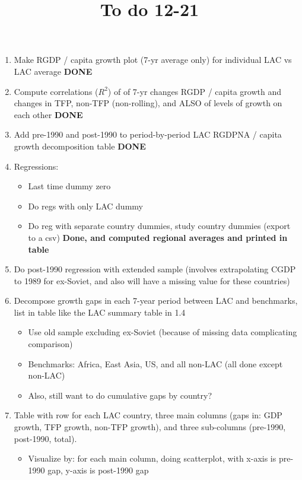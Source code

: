 \documentclass[12pt,english]{article}
\theoremstyle{remark}
\begin{document}
	
\title{To do 12-21}
\maketitle

\begin{enumerate}
	\item Make RGDP / capita growth plot (7-yr average only) for individual LAC vs LAC average \textbf{DONE}
	\item Compute correlations ($R^2$) of of 7-yr changes RGDP / capita growth and changes in TFP, non-TFP (non-rolling), and ALSO of levels of growth on each other \textbf{DONE}
	\item Add pre-1990 and post-1990 to period-by-period LAC RGDPNA / capita growth decomposition table  \textbf{DONE}
	\item Regressions:
	\begin{itemize}
		\item Last time dummy zero 
		\item Do regs with only LAC dummy 
		\item Do reg with separate country dummies, study country dummies (export to a csv) \textbf{Done, and computed regional averages and printed in table}
	\end{itemize}
	\item Do post-1990 regression with extended sample (involves extrapolating CGDP to 1989 for ex-Soviet, and also will have a missing value for these countries)
	\item Decompose growth gaps in each 7-year period between LAC and benchmarks, list in table like the LAC summary table in 1.4
	\begin{itemize}
		\item Use old sample excluding ex-Soviet (because of missing data complicating comparison)
		\item Benchmarks: Africa, East Asia, US, and all non-LAC (all done except non-LAC)
		\item Also, still want to do cumulative gaps by country?
	\end{itemize}
	\item Table with row for each LAC country, three main columns (gaps in: GDP growth, TFP growth, non-TFP growth), and three sub-columns (pre-1990, post-1990, total).
	\begin{itemize}
		\item Visualize by: for each main column, doing scatterplot, with x-axis is pre-1990 gap, y-axis is post-1990 gap
	\end{itemize}
\end{enumerate}
\end{document}
